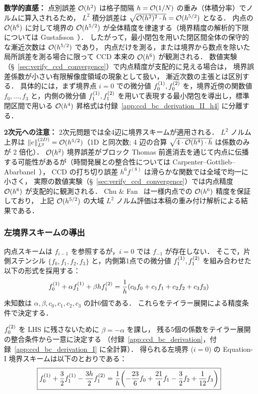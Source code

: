 \medskip\noindent\textbf{数学的直感：}
点別誤差 $\mathcal{O}(h^2)$ は格子間隔 $h = \mathcal{O}(1/N)$ の重み（体積分率）でノルムに算入されるため，
$L^2$ 積分誤差は $\sqrt{\mathcal{O}(h^2)^2 \cdot h} = \mathcal{O}(h^{5/2})$ となる．
内点の $\mathcal{O}(h^6)$ に対して境界の $\mathcal{O}(h^{5/2})$ が全体精度を律速する（境界精度の解析的下限については Gustafsson~\cite{Gustafsson1981}）．
したがって，最小閉包を用いた閉区間全体の保守的な漸近次数は $\mathcal{O}(h^{5/2})$ であり，
内点だけを測る，または境界から数点を除いた局所誤差を測る場合に限って
CCD 本来の $\mathcal{O}(h^6)$ が観測される．
数値実験（§~\ref{sec:verify_ccd_convergence}）で内点精度が支配的に見える場合は，
境界誤差係数が小さい有限解像度領域の現象として扱い，
漸近次数の主張とは区別する．
具体的には，まず境界点 $i=0$ での微分値 $f^{(1)}_{0}, f^{(2)}_{0}$ を，境界近傍の関数値 $f_0, \dots, f_3$ と，内側の微分値 $f^{(1)}_{1}, f^{(2)}_{1}$ を用いて表現する最小閉包を導出し，標準閉区間で用いる $\mathcal{O}(h^4)$ 昇格式は付録~\ref{app:ccd_bc_derivation_II_h4} に分離する．

\textbf{2次元への注意：} 2次元問題では全4辺に境界スキームが適用される．
$L^2$ ノルム上界は $\|e\|_{L^2}^{(2D)}=\mathcal{O}(h^{5/2})$（1D と同次数; 4 辺の合算
$\sqrt{4\cdot\mathcal{O}(h^4)\cdot h}$ は係数のみが 2 倍化）．
$\mathcal{O}(h^2)$ 境界誤差がブロック Thomas 前進消去を通じて内点に伝播する可能性があるが（時間発展との整合性については Carpenter--Gottlieb--Abarbanel~\cite{Carpenter1994}），
CCD の打ち切り誤差 $h^6 f^{(8)}$ は滑らかな関数では全域で均一に小さく，
実際の数値実験（§~\ref{sec:verify_ccd_convergence}）では内点精度 $\mathcal{O}(h^6)$ が支配的に観測される．
Chu \& Fan~\cite{ChuFan1998} は一様内点での $\mathcal{O}(h^6)$ 精度を保証しており，
上記 $\mathcal{O}(h^{5/2})$ の大域 $L^2$ ノルム評価は本稿の重み付け解析による結果である．

\subsubsection{左境界スキームの導出}

内点スキームは $f_{i-1}$ を参照するが，$i=0$ では $f_{-1}$ が存在しない．
そこで，片側ステンシル $\{f_0, f_1, f_2, f_3\}$ と，内側第1点での微分値 $f^{(1)}_{1}, f^{(2)}_{1}$ を組み合わせた以下の形式を採用する：
\begin{equation}
  f^{(1)}_{0} + \alpha f^{(1)}_{1} + \beta hf^{(2)}_{1}
  = \frac{1}{h}\!\left(c_0 f_0 + c_1 f_1 + c_2 f_2 + c_3 f_3\right)
  \label{eq:bc_general}
\end{equation}
未知数は $\alpha, \beta, c_0, c_1, c_2, c_3$ の計6個である．
これらをテイラー展開による精度条件で決定する．

$f^{(2)}_{0}$ を LHS に残さないために $\beta=-\alpha$ を課し，
残る5個の係数をテイラー展開の整合条件から一意に決定する
（付録~\ref{app:ccd_bc_derivation}，付録~\ref{app:ccd_bc_derivation_I} に全計算）．
得られる左境界 ($i=0$) の Equation-I 境界スキームは以下のとおりである：
\begin{equation}
  \boxed{
    f^{(1)}_{0} + \frac{3}{2}f^{(1)}_{1} - \frac{3h}{2}f^{(2)}_{1}
    = \frac{1}{h}\!\left(-\frac{23}{6}f_0 + \frac{21}{4}f_1 - \frac{3}{2}f_2 + \frac{1}{12}f_3\right)
  }
  \label{eq:bc_left}
\end{equation}

